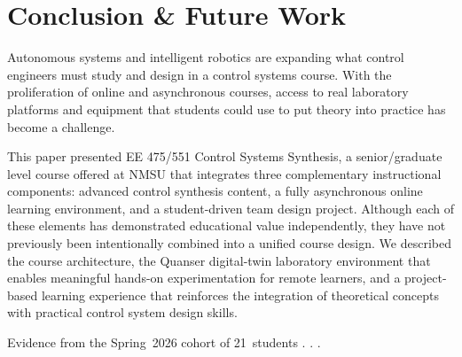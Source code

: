 \documentclass[journal]{IEEEtran}
\begin{document}



\section{Conclusion \& Future Work}
\label{sec:Conclusion}

Autonomous systems and intelligent robotics are expanding what
control engineers must study and design in a control systems course. With the proliferation of online and asynchronous courses, access to real laboratory platforms and equipment that students could use to put theory into practice has become a challenge.

This paper presented EE 475/551 Control Systems Synthesis, a senior/graduate level course offered at NMSU that integrates three complementary instructional components: advanced control synthesis content, a fully asynchronous online learning environment, and a student-driven team design project. Although each of these elements has demonstrated educational value independently, they have not previously been intentionally combined into a unified course design. 
We described the course architecture, the Quanser digital-twin laboratory environment that enables meaningful hands-on experimentation for remote learners, and a project-based learning experience that reinforces the integration of theoretical concepts with practical control system design skills. 

Evidence from the Spring~2026 cohort of 21~students . . .
\end{document}
